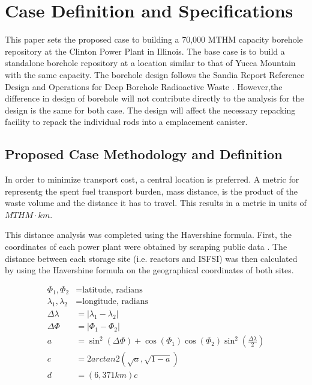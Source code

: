 \section{Case Definition and Specifications}

This paper sets the proposed case to building a 70,000 \gls{MTHM} capacity borehole
 repository at the Clinton Power Plant in Illinois. The base case is to build a
  standalone borehole repository at a location similar to that of Yucca Mountain with
   the same capacity. The borehole design follows the Sandia Report Reference Design
    and Operations for Deep Borehole Radioactive Waste \cite{arnold_reference_2011}.
     However,the difference in design of borehole will not contribute directly
     to the analysis for the design is the same for both case. The design will
     affect the necessary repacking facility to repack the individual rods into
     a emplacement canister.

\subsection{Proposed Case Methodology and Definition}
 In order to minimize transport cost, a central location is preferred. A metric 
 for representg the spent fuel transport burden, mass distance, is the product 
 of the waste volume and the distance it has to travel. This results in a 
 metric in units of $MTHM\cdot km$. 
 
 This distance analysis was completed using the Havershine formula. First, the 
 coordinates of each power plant were obtained by scraping public data 
 \cite{wikipedia}.  The distance between each storage site (i.e. reactors and 
 \gls{ISFSI}) was then calculated by using the Havershine formula on the 
 geographical coordinates of both sites. 

 \begin{align} 
         \Phi_1,\Phi_2&= \mbox{latitude, radians}\\
         \lambda_1,\lambda_2 &= \mbox{longitude, radians}\\
         \Delta\lambda &= \left|\lambda_1 - \lambda_2\right|\\
         \Delta\Phi &= \left|\Phi_1 - \Phi_2\right|\\
         a&=\sin^2(\Delta\Phi)+\cos(\Phi_1)\cos(\Phi_2)\sin^2{\left(\frac{\Delta\lambda}{2}\right)}\\
         c &= 2arctan2(\sqrt{a},\sqrt{1-a})\\
         d &=  (6,371km)c
 \end{align}


